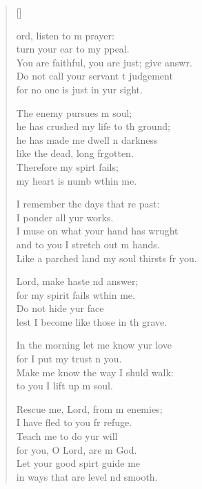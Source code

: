\settowidth{\versewidth}{You are faithful, you are just; give answer. +}
\begin{verse}[\versewidth]
  \begin{patverse}
    ord, listen to m prayer:\Med\\
    turn your ear to my ppeal.\\
    You are faithful, you are just; give answr.\Flex\\
    Do not call your servant t judgement\Med\\
    for no one is just in yur sight.

    The enemy pursues m soul;\Med\\
    he has crushed my life to th ground;\\
    he has made me dwell \pointup{\i}n darkness\Med\\
    like the dead, long frgotten.\\
    Therefore my spir\pointup{\i}t fails;\Med\\
    my heart is numb w\pointup{\i}thin me.

    I remember the days that re past:\Med\\
    I ponder all yur works.\\
    I muse on what your hand has wrught\Flex\\
    and to you I stretch out m hands.\Med\\
    Like a parched land my soul thirsts fr you.

    Lord, make haste nd answer;\Med\\
    for my spirit fails w\pointup{\i}thin me.\\
    Do not hide yur face\Med\\
    lest I become like those in th grave.

    In the morning let me know yur love\Med\\
    for I put my trust \pointup{\i}n you.\\
    Make me know the way I shuld walk:\Med\\
    to you I lift up m soul.

    Rescue me, Lord, from m enemies;\Med\\
    I have fled to you fr refuge.\\
    Teach me to do yur will\Med\\
    for you, O Lord, are m God.\\
    Let your good spir\pointup{\i}t guide me\Med\\
    in ways that are level nd smooth.


\end{patverse}
\end{verse}
